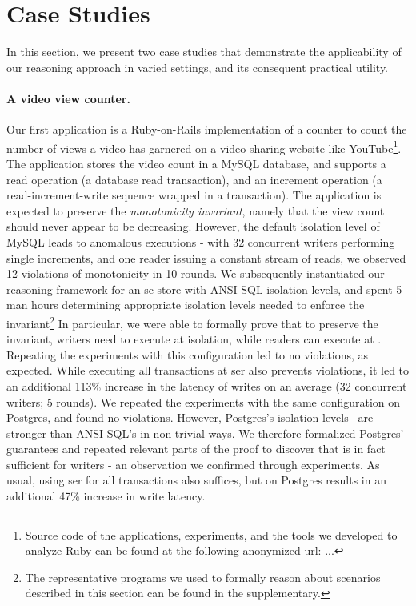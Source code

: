 \section{Case Studies}
\label{sec:case-studies}

In this section, we present two case studies that demonstrate the
applicability of our reasoning approach in varied settings, and its
consequent practical utility.

\paragraph{A video view counter.} Our first application is a
Ruby-on-Rails implementation of a counter to count the number of views
a video has garnered on a video-sharing website like
YouTube\footnote{Source code of the applications, experiments, and the
  tools we developed to analyze Ruby can be found at the following
  anonymized url: \url{...}}. The application stores the video count
in a MySQL database, and supports a read operation (a database read
transaction), and an increment operation (a read-increment-write
sequence wrapped in a transaction). The application is expected to
preserve the \emph{monotonicity invariant}, namely that the view count
should never appear to be decreasing. However, the default
 isolation level of MySQL leads to anomalous
executions - with 32 concurrent writers performing single increments,
and one reader issuing a constant stream of reads, we observed 12
violations of monotonicity in 10 rounds. We subsequently instantiated
our reasoning framework for an {\sc sc} store with ANSI SQL isolation
levels, and spent 5 man hours determining appropriate isolation levels
needed to enforce the invariant\footnote{The representative \txnimp
  programs we used to formally reason about scenarios described in
  this section can be found in the supplementary.} In particular, we
were able to formally prove that to preserve the invariant, writers
need to execute at  isolation, while readers can
execute at . Repeating the experiments with this
configuration led to no violations, as expected. While executing all
transactions at {\sc ser} also prevents violations, it led to an
additional 113\% increase in the latency of writes on an average (32
concurrent writers; 5 rounds). We repeated the experiments with the
same configuration on Postgres, and found no violations. However,
Postgres's isolation levels~\cite{postgresiso} are stronger than ANSI
SQL's in non-trivial ways. We therefore formalized Postgres'
guarantees and repeated relevant parts of the proof to discover that
 is in fact sufficient for writers - an
observation we confirmed through experiments. As usual, using {\sc
  ser} for all transactions also suffices, but on Postgres results in
an additional 47\% increase in write latency.



